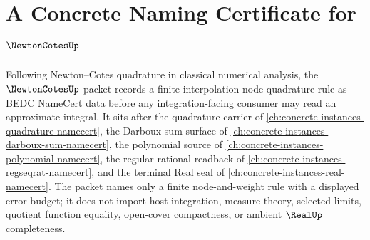 \chapter{A Concrete Naming Certificate for $\NewtonCotesUp$}
\label{ch:concrete-instances-newton-cotes-namecert}

Following Newton--Cotes quadrature in classical numerical analysis, the $\NewtonCotesUp$ packet records a finite interpolation-node quadrature rule as BEDC NameCert data before any integration-facing consumer may read an approximate integral. It sits after the quadrature carrier of \autoref{ch:concrete-instances-quadrature-namecert}, the Darboux-sum surface of \autoref{ch:concrete-instances-darboux-sum-namecert}, the polynomial source of \autoref{ch:concrete-instances-polynomial-namecert}, the regular rational readback of \autoref{ch:concrete-instances-regseqrat-namecert}, and the terminal Real seal of \autoref{ch:concrete-instances-real-namecert}. The packet names only a finite node-and-weight rule with a displayed error budget; it does not import host integration, measure theory, selected limits, quotient function equality, open-cover compactness, or ambient $\RealUp$ completeness.


